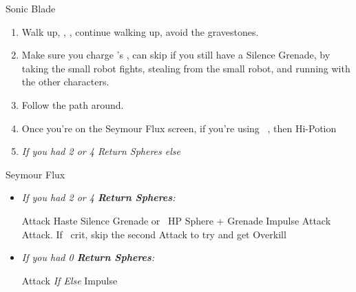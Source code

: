 \begin{equip}
	\begin{itemize}
		\auronf Sonic Blade
	\end{itemize}
\end{equip}
\begin{enumerate}[resume]
	\item Walk up, \sd, \cs[1:20], continue walking up, avoid the gravestones.
	\item Make sure you charge \rikku's \od, can skip if you still have a Silence Grenade, by taking the small robot fights, stealing from the small robot, and running with the other characters.
	\item Follow the path around.
	\item Once you're on the Seymour Flux screen, if you're using \rikku\ \od, then Hi-Potion \rikku
	\item \formation{\tidus}{\yuna}{\auron} \textit{If you had 2 or 4 Return Spheres else } \formation{\tidus}{\kimahri}{\wakka}
\end{enumerate}
\begin{battle}[70000]{Seymour Flux}
	\begin{itemize}
		\item \textit{If you had 2 or 4 \textbf{Return Spheres}:}
		      \begin{itemize}
			      \yunaf Attack
			      \tidusf Haste \yuna
			      \switch{\auron}{\rikku}
			      \rikkuf Silence Grenade or \od\ HP Sphere + Grenade
			      \summon{\bahamut}
			      \bahamutf Impulse
			      \yunaf Attack
			      \tidusf Attack. If \yuna\ crit, skip the second Attack to try and get Overkill
		      \end{itemize}
		\item \textit{If you had 0 \textbf{Return Spheres}:}
		      \begin{itemize}
			      \switch{\tidus}{\yuna}
			      \summon{\bahamut}
			      \bahamutf Attack \textit{If \blitzwin Else} Impulse
		      \end{itemize}
	\end{itemize}
\end{battle}
